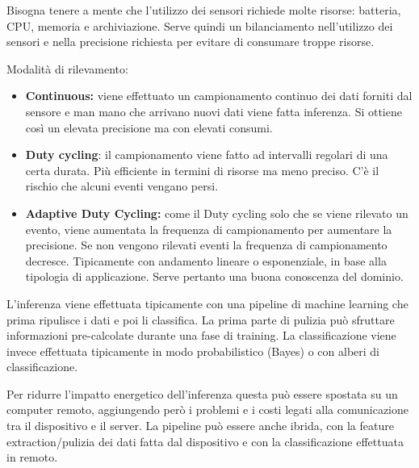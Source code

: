 Bisogna tenere a mente che l'utilizzo dei sensori richiede molte
risorse: batteria, CPU, memoria e archiviazione. Serve quindi un
bilanciamento nell'utilizzo dei sensori e nella precisione richiesta per
evitare di consumare troppe risorse.

Modalità di rilevamento:

\begin{itemize}
\item \textbf{Continuous:} viene effettuato un campionamento continuo dei
  dati forniti dal sensore e man mano che arrivano nuovi dati viene
  fatta inferenza. Si ottiene così un elevata precisione ma con elevati
  consumi.

\item \textbf{Duty cycling}: il campionamento viene fatto ad intervalli
  regolari di una certa durata. Più efficiente in termini di risorse ma
  meno preciso. C'è il rischio che alcuni eventi vengano persi.

\item \textbf{Adaptive Duty Cycling:} come il Duty cycling solo che se viene
  rilevato un evento, viene aumentata la frequenza di campionamento per
  aumentare la precisione. Se non vengono rilevati eventi la frequenza
  di campionamento decresce. Tipicamente con andamento lineare o
  esponenziale, in base alla tipologia di applicazione. Serve pertanto
  una buona conoscenza del dominio.

\end{itemize}

L'inferenza viene effettuata tipicamente con una pipeline di machine
learning che prima ripulisce i dati e poi li classifica. La prima parte
di pulizia può sfruttare informazioni pre-calcolate durante una fase di
training. La classificazione viene invece effettuata tipicamente in modo
probabilistico (Bayes) o con alberi di classificazione.

Per ridurre l'impatto energetico dell'inferenza questa può essere
spostata su un computer remoto, aggiungendo però i problemi e i costi
legati alla comunicazione tra il dispositivo e il server. La pipeline
può essere anche ibrida, con la feature extraction/pulizia dei dati
fatta dal dispositivo e con la classificazione effettuata in remoto.
